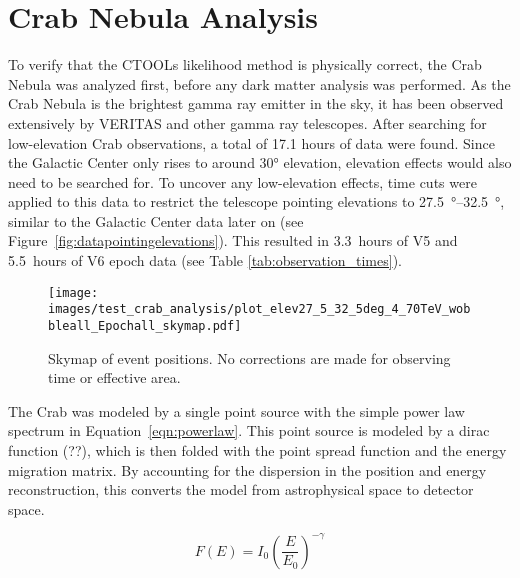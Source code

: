 \section{Crab Nebula Analysis}\label{sec:crab_analysis}
  To verify that the CTOOLs likelihood method is physically correct, the Crab Nebula was analyzed first, before any dark matter analysis was performed.
  As the Crab Nebula is the brightest gamma ray emitter in the sky, it has been observed extensively by VERITAS and other gamma ray telescopes.
  After searching for low-elevation Crab observations, a total of 17.1 hours of data were found.
  Since the Galactic Center only rises to around \ang{30} elevation, elevation effects would also need to be searched for.
  To uncover any low-elevation effects, time cuts were applied to this data to restrict the telescope pointing elevations to \SIrange{27.5}{32.5}{\degree}, similar to the Galactic Center data later on (see Figure~\ref{fig:datapointingelevations}).
  This resulted in \SI{3.3}{hours} of V5 and \SI{5.5}{hours} of V6 epoch data (see Table \ref{tab:observation_times}).
    
  \begin{figure}[h]
    \centering
    \texttt{[image: images/test\_crab\_analysis/plot\_elev27\_5\_32\_5deg\_4\_70TeV\_wobbleall\_Epochall\_skymap.pdf]}
    \caption[Crab Counts Skymap]
    {
      Skymap of event positions.
      No corrections are made for observing time or effective area.
    }
    \label{fig:crab_skymap}
  \end{figure}
  
  The Crab was modeled by a single point source with the simple power law spectrum in Equation~\ref{eqn:powerlaw}.
  This point source is modeled by a dirac function {\color{red}(??)}, which is then folded with the point spread function and the energy migration matrix.
  By accounting for the dispersion in the position and energy reconstruction, this converts the model from astrophysical space to detector space.

  \begin{equation} \label{eqn:powerlaw}
  F\left( E \right) = I_{0} \left( \frac{E}{E_{0}} \right)^{-\gamma}
  \end{equation}

